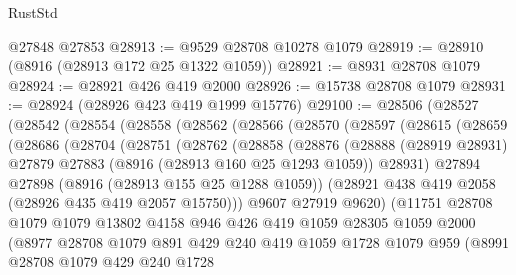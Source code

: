 \begin{lexlean}{RustStd}
\begin{coremodule}
    @27848
    @27853
@28913 := @9529 @28708 @10278 @1079
@28919 := @28910 (@8916 (@28913 @172 @25 @1322 @1059))
@28921 := @8931 @28708 @1079
@28924 := @28921 @426 @419 @2000
@28926 := @15738 @28708 @1079
@28931 := @28924 (@28926 @423 @419 @1999 @15776)
@29100 := @28506
    (@28527
      (@28542
        (@28554
          (@28558
            (@28562
              (@28566
                (@28570
                  (@28597
                    (@28615
                      (@28659
                        (@28686
                          (@28704
                            (@28751
                              (@28762
                                (@28858
                                  (@28876
                                    (@28888
                                      (@28919 @28931)
                                      @27879
                                      @27883
                                      (@8916 (@28913 @160 @25 @1293 @1059))
                                      @28931)
                                    @27894
                                    @27898
                                    (@8916 (@28913 @155 @25 @1288 @1059))
                                    (@28921 @438 @419 @2058 (@28926 @435 @419 @2057 @15750)))
                                  @9607
                                  @27919
                                  @9620)
                                (@11751
                                  @28708
                                  @1079
                                  @1079
                                  @13802
                                  @4158
                                  @946
                                  @426
                                  @419
                                  @1059
                                  @28305
                                  @1059
                                  @2000
                                  (@8977
                                    @28708
                                    @1079
                                    @891
                                    @429
                                    @240
                                    @419
                                    @1059
                                    @1728
                                    @1079
                                    @959
                                    (@8991
                                      @28708
                                      @1079
                                      @429
                                      @240
                                      @1728

\end{coremodule}
\end{lexlean}
